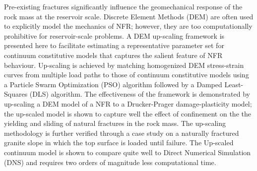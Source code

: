 Pre-existing fractures significantly influence the geomechanical response of the rock mass at the reservoir scale.  Discrete Element Methods (DEM) are often used to explicitly model the mechanics of NFR; however, they are too computationally prohibitive for reservoir-scale problems. A DEM up-scaling framework is presented here to facilitate estimating a representative parameter set for continuum constitutive models that captures the salient feature of NFR behaviour. Up-scaling is achieved by matching homogenized DEM stress-strain curves from multiple load paths to those of continuum constitutive models using a Particle Swarm Optimization (PSO) algorithm followed by a Damped Least-Squares (DLS) algorithm. The effectiveness of the framework is demonstrated by up-scaling a DEM model of a NFR to a Drucker-Prager damage-plasticity model; the up-scaled model is shown to capture well the effect of confinement on the the yielding and sliding of natural fractures in the rock mass. The up-scaling methodology is further verified through a case study on a naturally fractured granite slope in which the top surface is loaded until failure. The Up-scaled continuum model is shown to compare quite well to Direct Numerical Simulation (DNS) and requires two orders of magnitude less computational time.